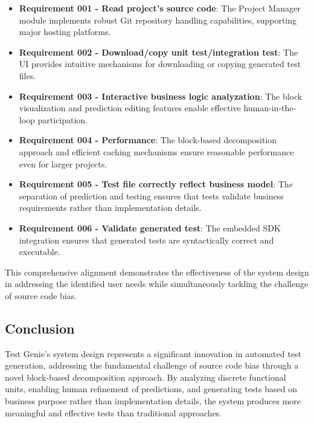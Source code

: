 \begin{itemize}
    \item \textbf{Requirement 001 - Read project's source code}: The Project Manager module implements robust Git repository handling capabilities, supporting major hosting platforms.
    
    \item \textbf{Requirement 002 - Download/copy unit test/integration test}: The UI provides intuitive mechanisms for downloading or copying generated test files.
    
    \item \textbf{Requirement 003 - Interactive business logic analyzation}: The block visualization and prediction editing features enable effective human-in-the-loop participation.
    
    \item \textbf{Requirement 004 - Performance}: The block-based decomposition approach and efficient caching mechanisms ensure reasonable performance even for larger projects.
    
    \item \textbf{Requirement 005 - Test file correctly reflect business model}: The separation of prediction and testing ensures that tests validate business requirements rather than implementation details.
    
    \item \textbf{Requirement 006 - Validate generated test}: The embedded SDK integration ensures that generated tests are syntactically correct and executable.
\end{itemize}

\hspace{0.5cm}This comprehensive alignment demonstrates the effectiveness of the system design in addressing the identified user needs while simultaneously tackling the challenge of source code bias.

\subsection{Conclusion}

\hspace{0.5cm}Test Genie's system design represents a significant innovation in automated test generation, addressing the fundamental challenge of source code bias through a novel block-based decomposition approach. By analyzing discrete functional units, enabling human refinement of predictions, and generating tests based on business purpose rather than implementation details, the system produces more meaningful and effective tests than traditional approaches.

